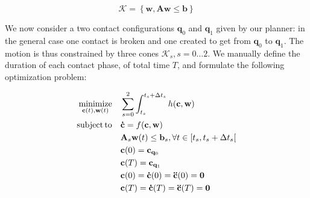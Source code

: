 \begin{equation}
\label{eq:cone_k}
	\mathcal{K} =  \left\{ \mathbf{w}, \mathbf{A}\mathbf{w} \leq \mathbf{b	} \right\}
\end{equation}

We now consider a two contact configurations  $\mathbf{q}_0$ and $\mathbf{q}_1$ given by our planner: in the general case one contact is broken and one created to get from
$\mathbf{q}_0$ to $\mathbf{q}_1$. The motion is thus constrained by three cones $\mathcal{K}_s, s =0 \dots 2$. We manually define the duration of each contact phase, of total
time $T$, and formulate the following optimization problem:

\begin{equation} \label{eq:lin_prog_rob} \begin{aligned}
\operatorname*{minimize}_{\mathbf{c}(t), \mathbf{w}(t)}  \quad & \sum_{s=0}^{2} \int_{t_s}^{t_s + \Delta t_s}  h(\mathbf{c}, \mathbf{w})  \\
\operatorname*{subject\,to} \quad & \mathbf{\dot{c}} = f(\mathbf{c}, \mathbf{w}) \\
	\quad & \mathbf{A}_s \mathbf{w}(t)  \leq \mathbf{b}_s , \forall t \in  \left[t_s, t_s + \Delta t_s \right[ \\
	\quad & \mathbf{c}(0)  = \mathbf{c}_{\mathbf{q}_0} \\
	\quad & \mathbf{c}(T)  = \mathbf{c}_{\mathbf{q}_1} \\
	\quad & \mathbf{c}(0)  = \mathbf{\dot{c}}(0)  = \mathbf{\ddot{c}}(0) = \mathbf{0}\\
	\quad & \mathbf{c}(T)  = \mathbf{\dot{c}}(T)  = \mathbf{\ddot{c}}(T) = \mathbf{0}\\
\end{aligned} \end{equation}

